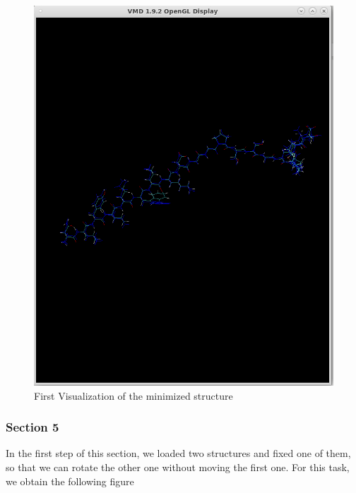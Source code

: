 \documentclass[11pt]{article}
\makeatletter
\def\maxwidth{\ifdim\Gin@nat@width>\linewidth\linewidth
    \else\Gin@nat@width\fi}
\let\Oldincludegraphics\includegraphics
\renewcommand{\includegraphics}[1]{\Oldincludegraphics[width=.8\maxwidth]{#1}}
\makeatother
\begin{document}
\begin{figure}
\centering
\includegraphics{Screenshot_fig_trp_min.png}
\caption{First Visualization of the minimized structure}
\end{figure}

\subsubsection{Section 5}\label{section-5}

In the first step of this section, we loaded two structures and fixed
one of them, so that we can rotate the other one without moving the
first one. For this task, we obtain the following figure
\end{document}

